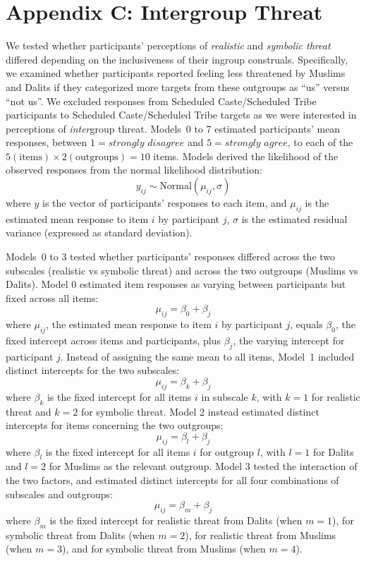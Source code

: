 \documentclass[12pt, a4paper]{article}
\begin{document}
\section{Appendix C: Intergroup Threat}

We tested whether participants' perceptions of \emph{realistic} and \emph{symbolic threat} differed depending on the inclusiveness of their ingroup construals. Specifically, we examined whether participants reported feeling less threatened by Muslims and Dalits if they categorized more targets from these outgroups as ``us'' versus ``not us''. We excluded responses from Scheduled Caste/Scheduled Tribe participants to Scheduled Caste/Scheduled Tribe targets as we were interested in perceptions of \emph{inter}group threat. Models~0 to 7 estimated participants' mean responses, between $1 = \textit{strongly disagree}$ and $5 = \textit{strongly agree}$, to each of the $ 5 (\text{items}) \times 2 (\text{outgroups}) = 10$ items. Models derived the likelihood of the observed responses from the normal likelihood distribution: $$ y_{ij} \sim \text{Normal} (\mu_{ij}, \sigma) $$ where $y$ is the vector of participants' responses to each item, and $\mu_{ij}$ is the estimated mean response to item $i$ by participant $j$, $\sigma$ is the estimated residual variance (expressed as standard deviation).

Models~0 to 3 tested whether participants' responses differed across the two subscales (realistic vs symbolic threat) and across the two outgroups (Muslims vs Dalits).  Model 0 estimated item responses as varying between participants but fixed across all items: $$ \mu_{ij} = \beta_0 + \beta_{j} $$ where $\mu_{ij}$, the estimated mean response to item $i$ by participant $j$, equals $\beta_0$, the fixed intercept across items and participants, plus $\beta_j$, the varying intercept for participant $j$. Instead of assigning the same mean to all items, Model~1 included distinct intercepts for the two subscales: $$ \mu_{ij} = \beta_k + \beta_{j} $$ where $\beta_k$ is the fixed intercept for all items $i$ in subscale $k$, with $k = 1$ for realistic threat and $k = 2$ for symbolic threat. Model 2 instead estimated distinct intercepts for items concerning the two outgroups: $$ \mu_{ij} = \beta_l + \beta_{j} $$ where $\beta_l$ is the fixed intercept for all items $i$ for outgroup $l$, with $l = 1$ for Dalits and $l = 2$ for Muslims as the relevant outgroup. Model 3 tested the interaction of the two factors, and estimated distinct intercepts for all four combinations of subscales and outgroups: $$ \mu_{ij} = \beta_m + \beta_{j} $$ where $\beta_m$ is the fixed intercept for realistic threat from Dalits (when $m = 1$), for symbolic threat from Dalits (when $m = 2$), for realistic threat from Muslims (when $m = 3$), and for symbolic threat from Muslims (when $m = 4$). 
\end{document}
